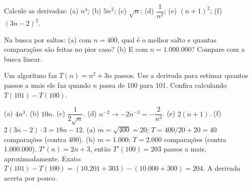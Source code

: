 \begin{exrapido}
Calcule as derivadas: (a) $n^4$; (b) $5n^2$; (c) $\sqrt{n}$; (d) $\dfrac{1}{n^2}$;
(e) $(n + 1)^2$; (f) $(3n - 2)^2$.
\end{exrapido}

\begin{exrapido}
Na busca por saltos: (a) com $n = 400$, qual é o melhor salto e quantas comparações são feitas
no pior caso? (b) E com $n = 1.000.000$? Compare com a busca linear.
\end{exrapido}

\begin{exrapido}
Um algoritmo faz $T(n) = n^2 + 3n$ passos. Use a derivada para estimar quantos passos a mais ele
faz quando $n$ passa de 100 para 101. Confira calculando $T(101) - T(100)$.
\end{exrapido}

\begin{respostas}
   (a) $4n^3$. (b) $10n$. (c) $\dfrac{1}{2\sqrt{n}}$. (d) $n^{-2} \to -2n^{-3} = -\dfrac{2}{n^3}$.
  (e) $2(n + 1)$. (f) $2(3n - 2) \cdot 3 = 18n - 12$.
   (a) $m = \sqrt{400} = 20$; $T = 400/20 + 20 = 40$ comparações (contra 400).
  (b) $m = 1.000$; $T = 2.000$ comparações (contra 1.000.000).
   $T'(n) = 2n + 3$, então $T'(100) = 203$ passos a mais, aproximadamente. Exato:
  $T(101) - T(100) = (10.201 + 303) - (10.000 + 300) = 204$. A derivada acerta por pouco.
\end{respostas}
